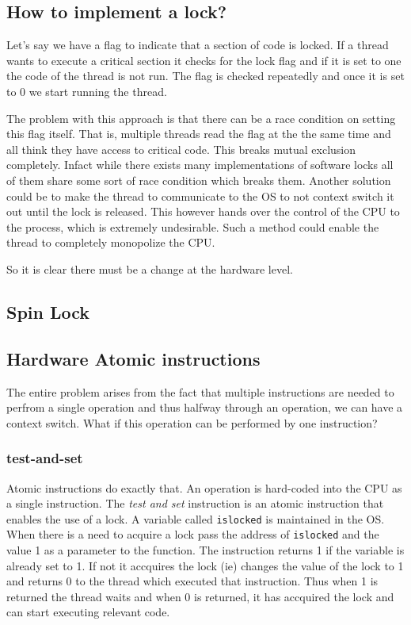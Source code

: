 \documentclass[12pt]{article}
\begin{document}
\subsection{How to implement a lock?}
Let's say we have a flag to indicate that a section of code is locked. If a thread wants to execute a critical section it checks for the 
lock flag and if it is set to one the code of the thread is not run. The flag is checked repeatedly and once it is set to 0 we start running the thread. 

The problem with this approach is that there can be a race condition on setting this flag itself. That is, multiple threads read the flag at the the same time and all think they have access to critical code.
This breaks mutual exclusion completely. Infact while there exists many implementations of software locks all of them share some sort of race condition which breaks them. Another
solution could be to make the thread to communicate to the OS to not context switch it out until the lock is released. This however hands over the control of the CPU to the process, which is extremely undesirable.
Such a method could enable the thread to completely monopolize the CPU. 

So it is clear there must be a change at the hardware level.  
\subsection{Spin Lock}
\subsection*{Hardware Atomic instructions}
The entire problem arises from the fact that multiple instructions are needed to perfrom a single operation and thus halfway through an operation,
we can have a context switch. What if this operation can be performed by one instruction?

\subsubsection*{test-and-set}
Atomic instructions do exactly that. An operation is hard-coded into the CPU as a single instruction. 
The \textit{test and set} instruction is an atomic instruction that enables the use of a lock. A variable called \texttt{islocked} 
is maintained in the OS. When there is a need to acquire a lock pass the address of \texttt{islocked} and the value 1 as a parameter to the function. 
The instruction returns 1 if the variable is already set to 1. If not it accquires the lock (ie)
changes the value of the lock to 1 and returns 0 to the thread which executed that instruction. Thus when 1 is returned the thread waits and when 0 is returned, it has
accquired the lock and can start executing relevant code. 
\end{document}
